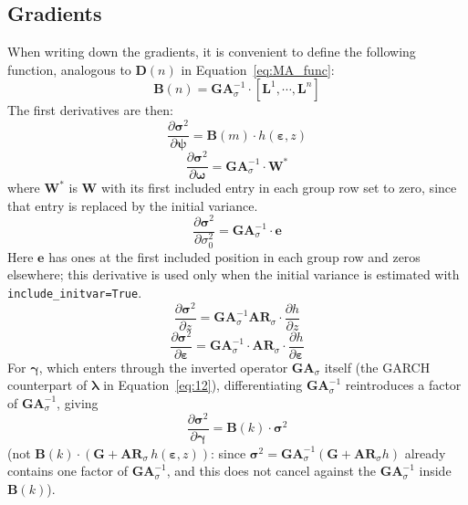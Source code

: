 \documentclass[12pt]{article}
\begin{document}
\subsection{Gradients}
When writing down the gradients, it is convenient to define the following function, analogous to $\mathbf{D}(n)$ in Equation~\ref{eq:MA_func}:
\begin{equation}
\mathbf{B}(n)
= \mathbf{GA}_{\sigma}^{-1} \cdot [\mathbf{L}^{1},  \cdots , \mathbf{L}^{n}]
\label{eq:GA_func}
\end{equation}
The first derivatives are then:
\begin{equation}
\frac{\partial \mathbf{\sigma}^{2} }{\partial\mathbf{\psi}} =\mathbf{B}(m) \cdot h( \mathbf{\varepsilon},z )
\label{eq:26}
\end{equation}
\begin{equation}
\frac{\partial \mathbf{\sigma}^{2} }{\partial\boldsymbol{\omega}} =  \mathbf{GA}_{\sigma}^{-1} \cdot
\mathbf{W}^{*}
\label{eq:27}
\end{equation}
where $\mathbf{W}^{*}$ is $\mathbf{W}$ with its first included entry in each group row set to zero, since that entry is replaced by the initial variance.
\begin{equation}
\frac{\partial \mathbf{\sigma}^{2} }{\partial\sigma_0^{2}} =\mathbf{GA}_{\sigma}^{-1} \cdot
\mathbf{e}
\label{eq:28}
\end{equation}
Here $\mathbf{e}$ has ones at the first included position in each group row and zeros elsewhere; this derivative is used only when the initial variance is estimated with \texttt{include\_initvar=True}.
\begin{equation}
\frac{\partial \mathbf{\sigma}^{2} }{\partial z} =\mathbf{GA}_{\sigma}^{-1} \mathbf{AR}_{\sigma} \cdot \frac{\partial h}{\partial z}
\label{eq:29}
\end{equation}
\begin{equation}
\frac{\partial \mathbf{\sigma}^{2} }{\partial\mathbf{\varepsilon}} = \mathbf{GA}_{\sigma}^{- 1}\cdot \mathbf{AR}_{\sigma} \cdot \frac{\partial h}{\partial \mathbf{\varepsilon}}
\label{eq:32}
\end{equation}
For $\boldsymbol{\gamma}$, which enters through the inverted operator $\mathbf{GA}_{\sigma}$ itself (the GARCH counterpart of $\boldsymbol{\lambda}$ in Equation~\ref{eq:12}), differentiating $\mathbf{GA}_{\sigma}^{-1}$ reintroduces a factor of $\mathbf{GA}_{\sigma}^{-1}$, giving
\begin{equation}
\frac{\partial \mathbf{\sigma}^{2} }{\partial\mathbf{\gamma}} = \mathbf{B}(k)\cdot\boldsymbol{\sigma}^{2}
\label{eq:25}
\end{equation}
(not $\mathbf{B}(k)\cdot(\mathbf{G}+\mathbf{AR}_{\sigma}\,h(\boldsymbol{\varepsilon},z))$: since $\boldsymbol{\sigma}^{2}=\mathbf{GA}_{\sigma}^{-1}(\mathbf{G}+\mathbf{AR}_{\sigma}h)$ already contains one factor of $\mathbf{GA}_{\sigma}^{-1}$, and this does not cancel against the $\mathbf{GA}_{\sigma}^{-1}$ inside $\mathbf{B}(k)$).
\end{document}
